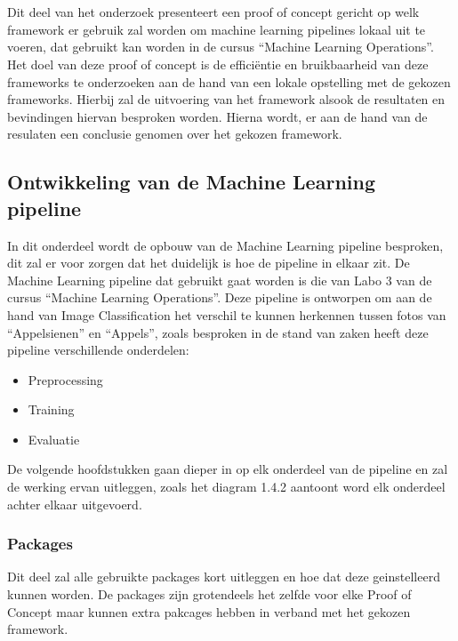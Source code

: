 \chapter{}%
\label{ch:PoC}

Dit deel van het onderzoek presenteert een proof of concept gericht op welk framework er gebruik zal worden om machine learning pipelines lokaal uit te voeren, dat gebruikt kan worden in de cursus ``Machine Learning Operations''.
Het doel van deze proof of concept is de efficiëntie en bruikbaarheid van deze frameworks te onderzoeken aan de hand van een lokale opstelling met de gekozen frameworks. Hierbij zal de uitvoering van het framework alsook de resultaten en bevindingen hiervan besproken worden.
Hierna wordt, er aan de hand van de resulaten een conclusie genomen over het gekozen framework.

\section{Ontwikkeling van de Machine Learning pipeline}
In dit onderdeel wordt de opbouw van de Machine Learning pipeline besproken, dit zal er voor zorgen dat het duidelijk is hoe de pipeline in elkaar zit.
De Machine Learning pipeline dat gebruikt gaat worden is die van Labo 3 van de cursus ``Machine Learning Operations''. Deze pipeline is ontworpen om aan de hand van Image Classification het verschil te kunnen herkennen tussen fotos van ``Appelsienen'' en ``Appels'', zoals besproken in de stand van zaken heeft deze pipeline verschillende onderdelen:

\begin{itemize}
    \item Preprocessing
    \item Training
    \item Evaluatie
\end{itemize}

De volgende hoofdstukken gaan dieper in op elk onderdeel van de pipeline en zal de werking ervan uitleggen, zoals het diagram 1.4.2 aantoont word elk onderdeel achter elkaar uitgevoerd.
\subsection*{Packages}
Dit deel zal alle gebruikte packages kort uitleggen en hoe dat deze geinstelleerd kunnen worden. De packages zijn grotendeels het zelfde voor elke Proof of Concept maar kunnen extra pakcages hebben in verband met het gekozen framework.

